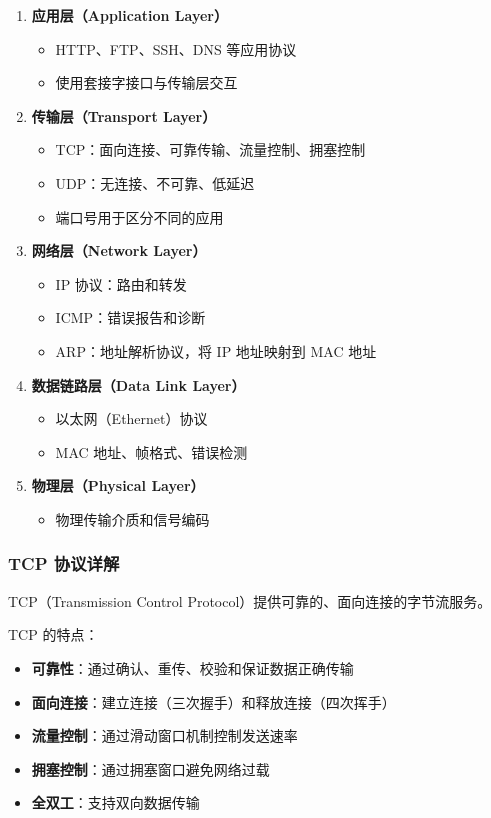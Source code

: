 \begin{enumerate}
  \item \textbf{应用层（Application Layer）}
    \begin{itemize}
      \item HTTP、FTP、SSH、DNS 等应用协议
      \item 使用套接字接口与传输层交互
    \end{itemize}

  \item \textbf{传输层（Transport Layer）}
    \begin{itemize}
      \item TCP：面向连接、可靠传输、流量控制、拥塞控制
      \item UDP：无连接、不可靠、低延迟
      \item 端口号用于区分不同的应用
    \end{itemize}

  \item \textbf{网络层（Network Layer）}
    \begin{itemize}
      \item IP 协议：路由和转发
      \item ICMP：错误报告和诊断
      \item ARP：地址解析协议，将 IP 地址映射到 MAC 地址
    \end{itemize}

  \item \textbf{数据链路层（Data Link Layer）}
    \begin{itemize}
      \item 以太网（Ethernet）协议
      \item MAC 地址、帧格式、错误检测
    \end{itemize}

  \item \textbf{物理层（Physical Layer）}
    \begin{itemize}
      \item 物理传输介质和信号编码
    \end{itemize}
\end{enumerate}

\subsubsection{TCP 协议详解}

TCP（Transmission Control Protocol）提供可靠的、面向连接的字节流服务。

TCP 的特点：
\begin{itemize}
  \item \textbf{可靠性}：通过确认、重传、校验和保证数据正确传输
  \item \textbf{面向连接}：建立连接（三次握手）和释放连接（四次挥手）
  \item \textbf{流量控制}：通过滑动窗口机制控制发送速率
  \item \textbf{拥塞控制}：通过拥塞窗口避免网络过载
  \item \textbf{全双工}：支持双向数据传输
\end{itemize}

